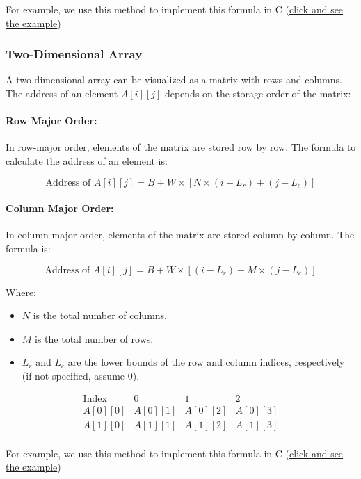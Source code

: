 \documentclass{book}
\begin{document}
For example, we use this method to implement this formula in C (\href{https://github.com/m-mdy-m/Arliz/blob/main/AddressCalculation/one-dimensional.c}{click and see the example})

\subsubsection{Two-Dimensional Array}

A two-dimensional array can be visualized as a matrix with rows and columns. The address of an element \( A[i][j] \) depends on the storage order of the matrix:

\paragraph{Row Major Order:}

In row-major order, elements of the matrix are stored row by row. The formula to calculate the address of an element is:

\[
\text{Address of } A[i][j] = B + W \times \left[ N \times (i - L_r) + (j - L_c) \right]
\]

\paragraph{Column Major Order:}

In column-major order, elements of the matrix are stored column by column. The formula is:

\[
\text{Address of } A[i][j] = B + W \times \left[ (i - L_r) + M \times (j - L_c) \right]
\]

Where:
\begin{itemize}
	\item \( N \) is the total number of columns.
	\item \( M \) is the total number of rows.
	\item \( L_r \) and \( L_c \) are the lower bounds of the row and column indices, respectively (if not specified, assume 0).
\end{itemize}

\[
\begin{array}{c|c|c|c}
	\text{Index} & 0 & 1 & 2 \\
	\hline
	A[0][0] & A[0][1] & A[0][2] & A[0][3] \\
	\hline
	A[1][0] & A[1][1] & A[1][2] & A[1][3] \\
\end{array}
\]

For example, we use this method to implement this formula in C (\href{https://github.com/m-mdy-m/Arliz/blob/main/AddressCalculation/Two-Dimensional.c}{click and see the example})
\end{document}

